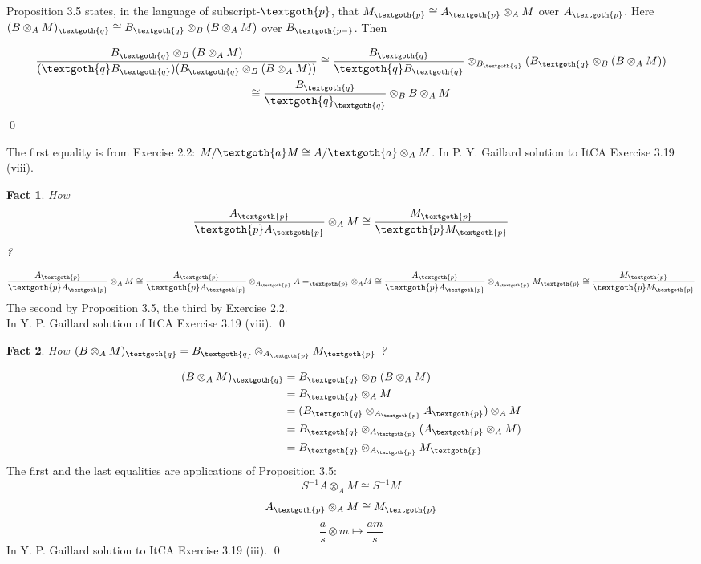 \documentclass{article}
\newtheorem{theorem}{Fact}[section]
\begin{document}
\noindent
Proposition 3.5 states, in the language of subscript-$\textgoth{p}$, that $M_\textgoth{p} \cong A_\textgoth{p} \otimes_A M$ over $A_\textgoth{p}$. Here $(B \otimes_
A M)_\textgoth{q} \cong B_\textgoth{q} \otimes_B (B \otimes_A M)$ over $B_\textgoth{p-}$. Then

\begin{gather*}
\frac{B_\textgoth{q} \otimes_B (B \otimes_A M)}{(\textgoth{q} B_\textgoth{q})(B_\textgoth{q} \otimes_B (B \otimes_A M))}
\cong
\frac{B_\textgoth{q}}{\textgoth{q} B_\textgoth{q}} \otimes_{B_\textgoth{q}} (B_\textgoth{q} \otimes_B (B \otimes_A M)) \\
\cong
\frac{B_\textgoth{q}}{\textgoth{q}_\textgoth{q}} \otimes_B B \otimes_A M
\end{gather*}
\qed

\noindent
The first equality is from Exercise 2.2: $M/\textgoth{a}M \cong 
A/\textgoth{a} \otimes_A M$. 
In P. Y. Gaillard solution to ItCA Exercise 3.19 (viii).

\begin{theorem}
How
\[
\frac{A_\textgoth{p}}{\textgoth{p} A_\textgoth{p}} \otimes_A M 
\cong
\frac{M_\textgoth{p}}{\textgoth{p} M_\textgoth{p}}
\]
?
\end{theorem}

\begin{gather*}
\frac{A_\textgoth{p}}{\textgoth{p} A_\textgoth{p}} \otimes_A M 
\cong 
\frac{A_\textgoth{p}}{\textgoth{p} A_\textgoth{p}} \otimes_{A_\textgoth{p}} A=_\textgoth{p} \otimes_A M 
\cong
\frac{A_\textgoth{p}}{\textgoth{p} A_\textgoth{p}} \otimes_{A_\textgoth{p}} M_\textgoth{p} 
\cong
\frac{M_\textgoth{p}}{\textgoth{p} M_\textgoth{p}}
\end{gather*}
\noindent
The second by Proposition 3.5, the third by Exercise 2.2. \\
In Y. P. Gaillard solution of ItCA Exercise 3.19 (viii).
\qed

\begin{theorem}
How $(B \otimes_A M)_\textgoth{q} = B_\textgoth{q} \otimes_{A_\textgoth{p}} M_\textgoth{p}$ ?
\end{theorem}

\noindent
\begin{equation*}
\begin{split}
(B \otimes_A M)_\textgoth{q} & = B_\textgoth{q} \otimes_B (B \otimes_A M) \\
                             & = B_\textgoth{q} \otimes_A M \\
                             & = (B_\textgoth{q} \otimes_{A_\textgoth{p}} A_\textgoth{p}) \otimes_A M \\
                             & = B_\textgoth{q} \otimes_{A_\textgoth{p}} (A_\textgoth{p} \otimes_A M) \\
                             & = B_\textgoth{q} \otimes_{A_\textgoth{p}} M_\textgoth{p}
\end{split}
\end{equation*}
\noindent
The first and the last equalities are applications of Proposition 3.5:
\[
  S^{-1}A \otimes_A M \cong S^{-1}M
\]
\[
  A_\textgoth{p} \otimes_A M \cong M_\textgoth{p}
\]
\[
\frac{a}{s} \otimes m \mapsto \frac{am}{s}
\]
In Y. P. Gaillard solution to ItCA Exercise 3.19 (iii).
\qed
\end{document}
